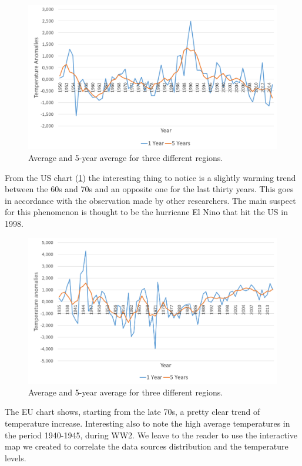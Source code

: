 \documentclass{vldb}
\begin{document}
\begin{figure}[tbh]
\includegraphics[width=1\linewidth]{UsAnomalies}
\caption{Average and 5-year average for three different regions.}
\label{fig:UsAnomalies}
\end{figure}

From the US chart (\ref{fig:UsAnomalies}) the interesting thing to notice is a slightly warming trend between the 60s and 70s and an opposite one for the last thirty years. This goes in accordance with the observation made by other researchers\cite{hansen2006global}. The main suspect for this phenomenon is thought to be the hurricane El Nino that hit the US in 1998.

\begin{figure}[tbh]
\includegraphics[width=1\linewidth]{EuAnomalies}
\caption{Average and 5-year average for three different regions.}
\label{fig:EuAnomalies}
\end{figure}

The EU chart shows, starting from the late 70s, a pretty clear trend of temperature increase. Interesting also to note the high average temperatures in the period 1940-1945, during WW2. We leave to the reader to use the interactive map we created to correlate the data sources distribution and the temperature levels.
\end{document}
